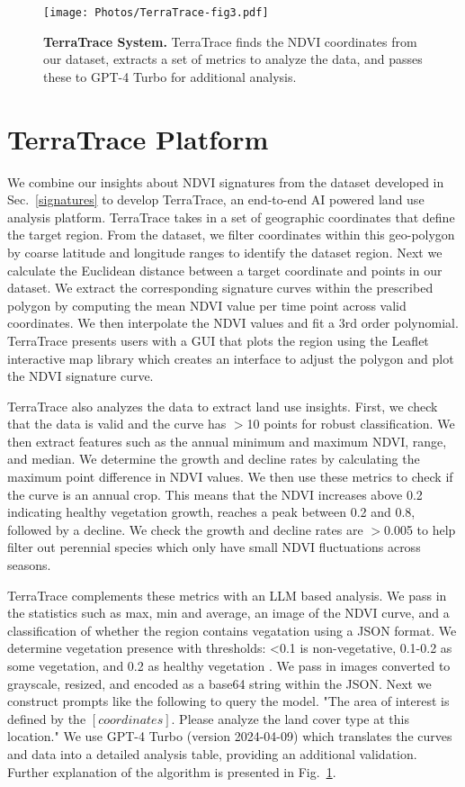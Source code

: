 \begin{figure}[t]
    \centering
    \texttt{[image: Photos/TerraTrace-fig3.pdf]}
    \vspace{-0.2cm}
    \caption{\textbf{TerraTrace System.} TerraTrace finds the NDVI coordinates from our dataset, extracts a set of metrics to analyze the data, and passes these to GPT-4 Turbo for additional analysis.}
    \label{fig:Fig3}
    \vspace{-0.5cm}
\end{figure}
\section{TerraTrace Platform}
\label{system}
We combine our insights about NDVI signatures from the dataset developed in Sec.~\ref{signatures} to develop TerraTrace, an end-to-end AI powered land use analysis platform. TerraTrace takes in a set of geographic coordinates that define the target region. From the dataset, we filter coordinates within this geo-polygon by coarse latitude and longitude ranges to identify the dataset region. Next we calculate the Euclidean distance between a target coordinate and points in our dataset. We extract the corresponding signature curves within the prescribed polygon by computing the mean NDVI value per time point across valid coordinates. We then interpolate the NDVI values and fit a 3rd order polynomial. TerraTrace presents users with a GUI that plots the region using the Leaflet interactive map library which creates an interface to adjust the polygon and plot the NDVI signature curve. 

TerraTrace also analyzes the data to extract land use insights. First, we check that the data is valid and the curve has $>$10 points for robust classification. We then extract features such as the annual minimum and maximum NDVI, range, and median. We determine the growth and decline rates by calculating the maximum point difference in NDVI values. We then use these metrics to check if the curve is an annual crop. This means that the NDVI increases above 0.2 indicating healthy vegetation growth, reaches a peak between 0.2 and 0.8, followed by a decline. We check the growth and decline rates are $>$0.005 to help filter out perennial species which only have small NDVI fluctuations across seasons.

TerraTrace complements these metrics with an LLM based analysis. We pass in the statistics such as max, min and average, an image of the NDVI curve, and a classification of whether the region contains vegatation using a JSON format. We determine vegetation presence with thresholds: <0.1 is non-vegetative, 0.1-0.2 as some vegetation, and 0.2 as healthy vegetation \cite{eos}. We pass in images converted to grayscale, resized, and encoded as a base64 string within the JSON. Next we construct prompts like the following to query the model. "The area of interest is defined by the $[{coordinates}]$. Please analyze the land cover type at this location." We use GPT-4 Turbo (version 2024-04-09) which translates the curves and data into a detailed analysis table, providing an additional validation. Further explanation of the algorithm is presented in Fig.~\ref{fig:Fig3}.

